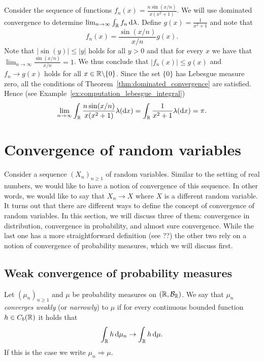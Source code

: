 \begin{example}
Consider the sequence of functions $f_n(x) = \frac{n \sin(x/n)}{x(x^2+1)}$. We will use dominated convergence to determine $\lim_{n \to \infty} \int_{\mathbb R} f_n \, \mathrm{d} \lambda$. Define $g(x) = \frac{1}{x^2 +1}$ and note that 
\[
	f_n(x) = \frac{\sin(x/n)}{x/n} g(x).
\]
Note that $|\sin(y)| \le |y|$ holds for all $y > 0$ and that for every $x$ we have that $\lim_{n \to \infty} \frac{\sin(x/n)}{x/n} = 1$. We thus conclude that $|f_n(x)| \le g(x)$ and $f_n \to g(x)$ holds for all $x \in \mathbb R \backslash \{0\}$. Since the set $\{0\}$ has Lebesgue measure zero, all the conditions of Theorem~\ref{thm:dominated_convergence} are satisfied. Hence (see Example~\ref{ex:computation_lebesgue_integral})
\[
	\lim_{n \to \infty} \int_{\mathbb R} \frac{n \sin(x/n)}{x(x^2+1)} \lambda(\mathrm{d} x) 
	= \int_{\mathbb R} \frac{1}{x^2 +1} \lambda(\mathrm{d} x) = \pi.
\]
\end{example}

\section{Convergence of random variables}

Consider a sequence $(X_n)_{n \ge 1}$ of random variables. Similar to the setting of real numbers, we would like to have a notion of convergence of this sequence. In other words, we would like to say that $X_n \to X$ where $X$ is a different random variable. It turns out that there are different ways to define the concept of convergence of random variables. In this section, we will discuss three of them: convergence in distribution, convergence in probability, and almost sure convergence. While the last one has a more straightforward definition (see ??) the other two rely on a notion of convergence of probability measures, which we will discuss first.

\subsection{Weak convergence of probability measures}

\begin{definition}
Let $(\mu_n)_{n \ge 1}$ and $\mu$ be probability measures on $(\mathbb R, \mathcal B_{\mathbb R})$. We say that $\mu_n$ \emph{converges weakly} (or \emph{narrowly}) to $\mu$ if for every continuous bounded function $h\in C_b(\mathbb R)$ it holds that
\[
	\int_{\mathbb R} h \, \mathrm{d} \mu_n \to \int_{\mathbb R} h \, \mathrm{d} \mu.
\]
If this is the case we write $\mu_n \Rightarrow \mu$.
\end{definition}

